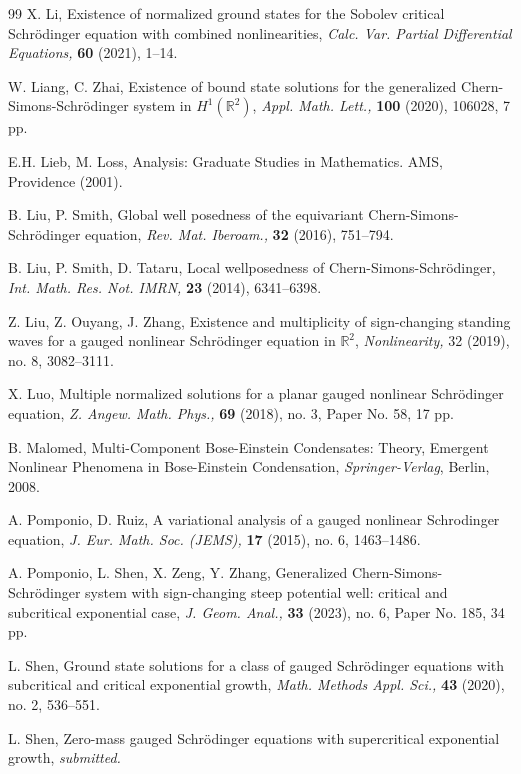 \documentclass[11pt]{amsart}
\numberwithin{equation}{section}
\theoremstyle{definition}
\newcommand{\R}{\mathbb{R}}
\begin{document}
\begin{thebibliography}{99}
X. Li, Existence of normalized ground states for the Sobolev critical Schr\"{o}dinger equation with
combined nonlinearities, {\it Calc. Var. Partial Differential Equations,} {\bf60} (2021), 1--14.

W. Liang, C. Zhai, Existence of bound state solutions for the generalized Chern-Simons-Schr\"{o}dinger system in $H^1(\R^2)$,
{\it Appl. Math. Lett.,} {\bf100} (2020), 106028, 7 pp.

E.H. Lieb, M. Loss, Analysis: Graduate Studies in Mathematics. AMS, Providence (2001).

B. Liu, P. Smith, Global well posedness of the equivariant Chern-Simons-Schr\"{o}dinger equation,
{\it Rev. Mat. Iberoam.,}
{\bf32} (2016), 751--794.

B. Liu, P. Smith, D. Tataru, Local wellposedness of Chern-Simons-Schr\"{o}dinger, {\it Int. Math. Res. Not. IMRN,}
{\bf 23} (2014),
6341--6398.

Z. Liu, Z. Ouyang, J. Zhang, Existence and multiplicity of sign-changing standing waves for a gauged nonlinear
Schr\"{o}dinger equation in $\R^2$, {\it Nonlinearity,} 32 (2019), no. 8, 3082--3111.

X. Luo, Multiple normalized solutions for a planar gauged nonlinear Schr\"{o}dinger equation,
{\it Z. Angew. Math. Phys.,} {\bf69} (2018), no. 3, Paper No. 58, 17 pp.

B. Malomed, Multi-Component Bose-Einstein Condensates: Theory, Emergent Nonlinear Phenomena in Bose-Einstein Condensation,
{\it Springer-Verlag}, Berlin, 2008.

A. Pomponio, D. Ruiz, A variational analysis of a gauged nonlinear Schrodinger equation,
{\it  J. Eur. Math. Soc. (JEMS),} {\bf17} (2015), no. 6, 1463--1486.

A. Pomponio, L. Shen, X. Zeng, Y. Zhang, Generalized Chern-Simons-Schr\"{o}dinger system with sign-changing steep
potential well: critical and subcritical exponential case, {\it J. Geom. Anal.,} {\bf33} (2023), no. 6, Paper No. 185, 34 pp.

L. Shen, Ground state solutions for a class of gauged Schr\"{o}dinger equations with subcritical and critical exponential growth,
{\it Math. Methods Appl. Sci.,} {\bf43} (2020), no. 2, 536--551.

L. Shen, Zero-mass gauged Schr\"{o}dinger equations with supercritical exponential growth, {\it submitted.}


\end{thebibliography}
\end{document}
